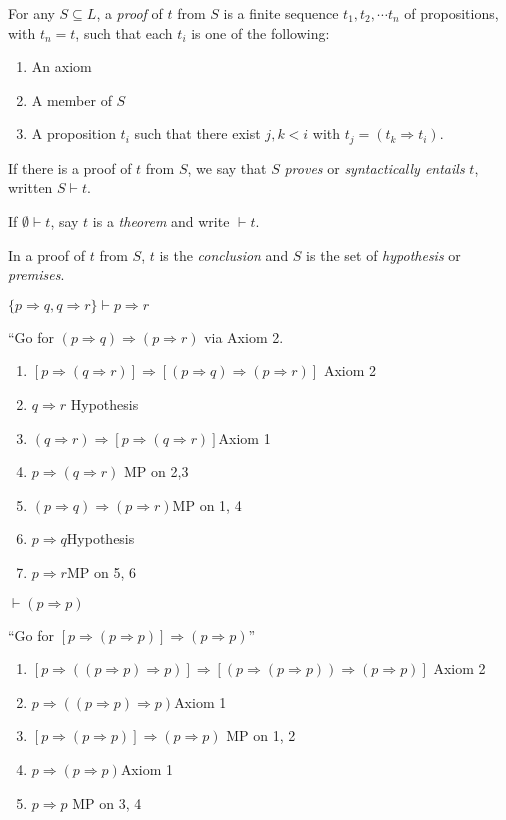 \documentclass[a4paper]{article}
\begin{document}
\begin{defi}
  For any $S\subseteq L$, a \emph{proof} of $t$ from $S$ is a finite sequence $t_1, t_2, \cdots t_n$ of propositions, with $t_n = t$, such that each $t_i$ is one of the following:
\begin{enumerate}
  \item An axiom
  \item A member of $S$
  \item A proposition $t_i$ such that there exist $j, k < i$ with $t_j = (t_k\Rightarrow t_i)$.
\end{enumerate}
If there is a proof of $t$ from $S$, we say that $S$ \emph{proves} or \emph{syntactically entails} $t$, written $S\vdash t$.

If $\emptyset \vdash t$, say $t$ is a \emph{theorem} and write $\vdash t$.

In a proof of $t$ from $S$, $t$ is the \emph{conclusion} and $S$ is the set of \emph{hypothesis} or \emph{premises}.

\end{defi}
\begin{eg}
  $\{p\Rightarrow q, q\Rightarrow r\} \vdash p\Rightarrow r$

  ``Go for $(p\Rightarrow  q)\Rightarrow  (p\Rightarrow  r)$ via Axiom 2.
  \begin{enumerate}[label=\arabic{*}.]
    \item $[p\Rightarrow (q\Rightarrow r)]\Rightarrow [(p\Rightarrow q) \Rightarrow (p\Rightarrow r)]$ \hfill Axiom 2
    \item $q\Rightarrow r$ \hfill Hypothesis
    \item $(q\Rightarrow r)\Rightarrow [p\Rightarrow (q\Rightarrow r)]$\hfill Axiom 1
    \item $p\Rightarrow (q\Rightarrow r)$ \hfill MP on 2,3
    \item $(p\Rightarrow q)\Rightarrow (p\Rightarrow r)$\hfill MP on 1, 4
    \item $p\Rightarrow q$\hfill Hypothesis
    \item $p\Rightarrow r$\hfill MP on 5, 6
  \end{enumerate}
\end{eg}

\begin{eg}
  $\vdash (p\Rightarrow p)$

  ``Go for $[p\Rightarrow (p\Rightarrow p)]\Rightarrow (p\Rightarrow p)$''
  \begin{enumerate}[label=\arabic{*}.]
    \item $[p\Rightarrow ((p\Rightarrow p)\Rightarrow p)]\Rightarrow [(p\Rightarrow (p\Rightarrow p))\Rightarrow (p\Rightarrow p)]$ \hfill Axiom 2
    \item $p\Rightarrow ( (p\Rightarrow p)\Rightarrow p)$\hfill Axiom 1
    \item $[p\Rightarrow (p\Rightarrow p)]\Rightarrow (p\Rightarrow p)$ \hfill MP on 1, 2
    \item $p\Rightarrow (p\Rightarrow p)$\hfill Axiom 1
    \item $p\Rightarrow p$ \hfill MP on 3, 4
  \end{enumerate}
\end{eg}
\end{document}
